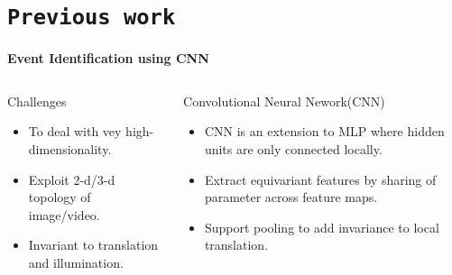 \section{\texttt{Previous work}}
\begin{frame}{\textbf{Event Identification using CNN}}
\begin{columns}
	\begin{column}{0.48\textwidth}
		\begin{varblock}[\textwidth]{Challenges}
			\begin{itemize}							
				\item To deal with vey high-dimensionality.
				\item Exploit 2-d/3-d topology of image/video.
				\item Invariant to translation and illumination.			
			\end{itemize}
		\end{varblock}
	\end{column}
	\begin{column}{0.48\textwidth}
		\begin{varblock}[\textwidth]{Convolutional Neural Nework\footnotemark (CNN)}			
			\begin{itemize}							
				\item CNN is an extension to MLP where hidden units are only connected locally.
				\item Extract equivariant features by sharing of parameter across feature maps.
				\item Support pooling to add invariance to local translation.			
			\end{itemize}
		\end{varblock}
	\end{column}
\end{columns}
\end{frame}
